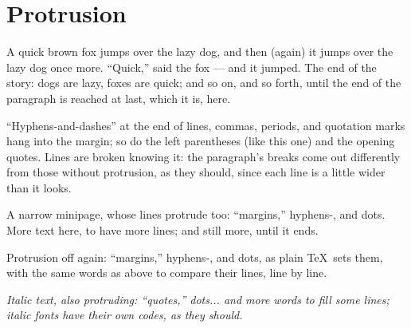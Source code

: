 \documentclass{article}
\begin{document}
\section{Protrusion}

A quick brown fox jumps over the lazy dog, and then (again) it jumps over
the lazy dog once more. ``Quick,'' said the fox --- and it jumped. The end
of the story: dogs are lazy, foxes are quick; and so on, and so forth,
until the end of the paragraph is reached at last, which it is, here.

``Hyphens-and-dashes'' at the end of lines, commas, periods, and quotation
marks hang into the margin; so do the left parentheses (like this one) and
the opening quotes. Lines are broken knowing it: the paragraph's breaks
come out differently from those without protrusion, as they should, since
each line is a little wider than it looks.

\begin{minipage}{0.5\textwidth}
A narrow minipage, whose lines protrude too: ``margins,'' hyphens-, and
dots. More text here, to have more lines; and still more, until it ends.
\end{minipage}

Protrusion off again: ``margins,'' hyphens-, and dots, as plain \TeX\ sets
them, with the same words as above to compare their lines, line by line.

\noindent\textit{Italic text, also protruding: ``quotes,'' dots... and more
words to fill some lines; italic fonts have their own codes, as they should.}
\end{document}
